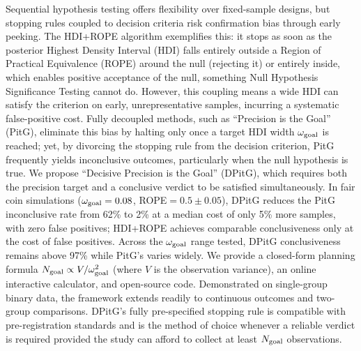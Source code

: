 Sequential hypothesis testing offers flexibility over fixed-sample designs, but stopping rules coupled to decision criteria risk confirmation bias through early peeking.
The HDI+ROPE algorithm exemplifies this: it stops as soon as the posterior Highest Density Interval (HDI) falls entirely outside a Region of Practical Equivalence (ROPE) around the null (rejecting it) or entirely inside, which enables positive acceptance of the null, something Null Hypothesis Significance Testing cannot do. However, this coupling means a wide HDI can satisfy the criterion on early, unrepresentative samples, incurring a systematic false-positive cost.
Fully decoupled methods, such as ``Precision is the Goal'' (PitG),
eliminate this bias by halting only once a target HDI width $\omega_{\rm goal}$ is reached;
yet, by divorcing the stopping rule from the decision criterion, PitG frequently yields inconclusive outcomes, particularly when the null hypothesis is true.
We propose ``Decisive Precision is the Goal'' (DPitG), which requires both the precision target and a conclusive verdict to be satisfied simultaneously.
In fair coin simulations ($\omega_{\rm goal}=0.08$, ROPE$=0.5\pm0.05$), DPitG reduces the PitG inconclusive rate from 62\% to 2\% at a median cost of only 5\% more samples, with zero false positives;
HDI+ROPE achieves comparable conclusiveness only at the cost of false positives.
Across the $\omega_{\rm goal}$ range tested, DPitG conclusiveness remains above 97\% while PitG's varies widely.
We provide a closed-form planning formula
$N_{\rm goal} \propto V/\omega_{\rm goal}^2$ (where $V$ is the observation variance),
an online interactive calculator, and open-source code.
Demonstrated on single-group binary data, the framework extends readily to continuous outcomes and two-group comparisons.
DPitG's fully pre-specified stopping rule is compatible with pre-registration standards
and is the method of choice whenever a reliable verdict is required
provided the study can afford to collect at least $N_{\rm goal}$ observations.

